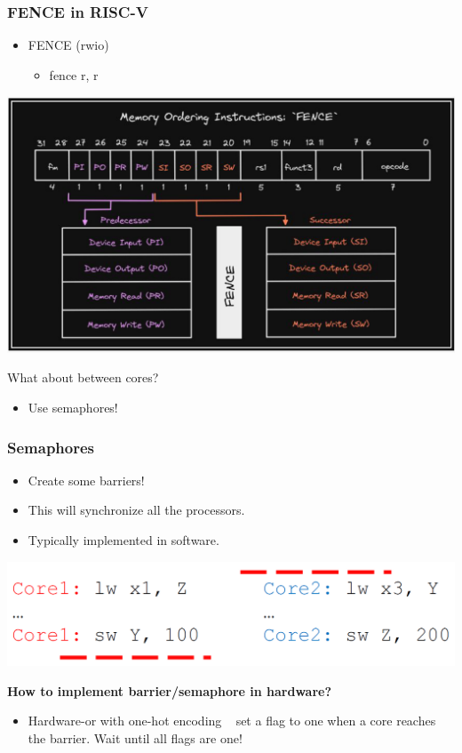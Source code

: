 \documentclass[10pt]{article}
\begin{document}
\subsubsection*{FENCE in RISC-V}
\begin{itemize}
    \item FENCE (rwio)
    \begin{itemize}
        \item fence r, r
    \end{itemize}
\end{itemize}
\begin{center}
    \includegraphics*[scale=0.6]{W9_6.png}
\end{center}
What about between cores?
\begin{itemize}
    \item Use semaphores!
\end{itemize}
\subsubsection*{Semaphores}
\begin{itemize}
    \item Create some barriers!
    \item This will synchronize all the processors.
    \item Typically implemented in software.
\end{itemize}
\begin{center}
    \includegraphics*[scale=0.4]{W9_7.png}
\end{center}
\textbf{How to implement barrier/semaphore in hardware?}
\begin{itemize}
    \item Hardware-or with one-hot encoding \textrightarrow~ set a flag to one when a core reaches the barrier.  Wait until all flags are one!
\end{itemize}
\end{document}
